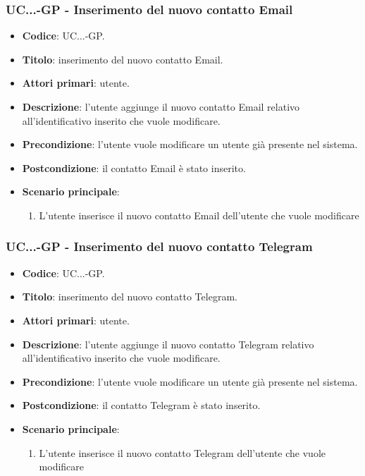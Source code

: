 			\subsubsection{UC\theuccount.\thesubuccount.\thesubsubuccount.\thesubsubsubuccount-GP - Inserimento del nuovo contatto Email}
				
				\begin{itemize}
					\item \textbf{Codice}: UC\theuccount.\thesubuccount.\thesubsubuccount.\thesubsubsubuccount-GP.
					\item \textbf{Titolo}: inserimento del nuovo contatto Email.
					\item \textbf{Attori primari}: utente.
					\item \textbf{Descrizione}: l'utente aggiunge il nuovo contatto Email relativo all'identificativo inserito che vuole modificare.
					\item \textbf{Precondizione}: l'utente vuole modificare un utente già presente nel sistema.
					\item \textbf{Postcondizione}: il contatto Email è stato inserito.
					\item \textbf{Scenario principale}:
					\begin{enumerate}
						\item L'utente inserisce il nuovo contatto Email dell'utente che vuole modificare
					\end{enumerate}
				\end{itemize}
			
			\subsubsection{UC\theuccount.\thesubuccount.\thesubsubuccount.\thesubsubsubuccount-GP - Inserimento del nuovo contatto Telegram}
				
				\begin{itemize}
					\item \textbf{Codice}: UC\theuccount.\thesubuccount.\thesubsubuccount.\thesubsubsubuccount-GP.
					\item \textbf{Titolo}: inserimento del nuovo contatto Telegram.
					\item \textbf{Attori primari}: utente.
					\item \textbf{Descrizione}: l'utente aggiunge il nuovo contatto Telegram relativo all'identificativo inserito che vuole modificare.
					\item \textbf{Precondizione}: l'utente vuole modificare un utente già presente nel sistema.
					\item \textbf{Postcondizione}: il contatto Telegram è stato inserito.
					\item \textbf{Scenario principale}:
					\begin{enumerate}
						\item L'utente inserisce il nuovo contatto Telegram dell'utente che vuole modificare
					\end{enumerate}
				\end{itemize}
            
